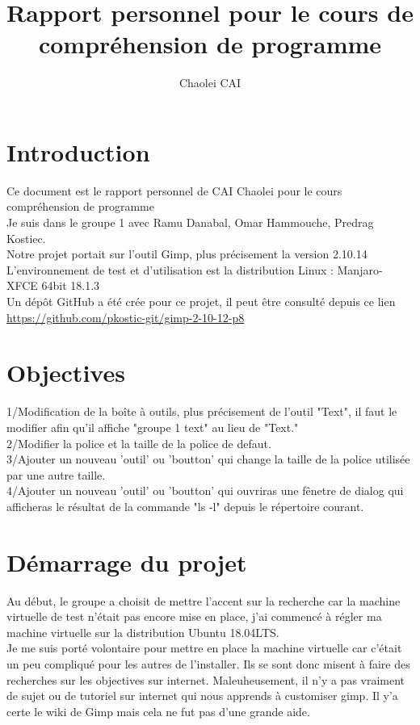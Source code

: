 \documentclass[12pt, letterpaper]{article}
\title{Rapport personnel pour le cours de compréhension de programme}
\author{Chaolei CAI}
\begin{document}
\begin{titlepage}
    \maketitle
\end{titlepage}

\tableofcontents
\section{Introduction}
Ce document est le rapport personnel de CAI Chaolei pour le cours compréhension de programme\\
Je suis dans le groupe 1 avec Ramu Danabal, Omar Hammouche, Predrag Kostiec. \\
Notre projet portait sur l'outil Gimp, plus précisement la version 2.10.14\\
L'environnement de test et d'utilisation est la distribution Linux : Manjaro-XFCE 64bit 18.1.3\\
Un dépôt GitHub a été crée pour ce projet, il peut être consulté depuis ce lien \url{https://github.com/pkostic-git/gimp-2-10-12-p8}


\section{Objectives}
1/Modification de la boîte à outils, plus précisement de l'outil "Text", il faut le modifier afin qu'il affiche "groupe 1 text" au lieu de "Text."\\
2/Modifier la police et la taille de la police de defaut.\\
3/Ajouter un nouveau 'outil' ou 'boutton' qui change la taille de la police utilisée par une autre taille.\\
4/Ajouter un nouveau 'outil' ou 'boutton' qui ouvriras une fênetre de dialog qui afficheras le résultat de la commande "ls -l" depuis le répertoire courant.

\section{Démarrage du projet}
Au début, le groupe a choisit de mettre l'accent sur la recherche car la machine virtuelle de test n'était pas encore mise en place, j'ai commencé à régler ma machine virtuelle sur la distribution Ubuntu 18.04LTS.\\
Je me suis porté volontaire pour mettre en place la machine virtuelle car c'était un peu compliqué pour les autres de l'installer. Ils se sont donc misent à faire des recherches sur les objectives sur internet.
 Maleuheusement, il n'y a pas vraiment de sujet ou de tutoriel sur internet qui nous apprends à customiser gimp. Il y'a certe le wiki de Gimp mais cela ne fut pas d'une grande aide.\\
\end{document}
